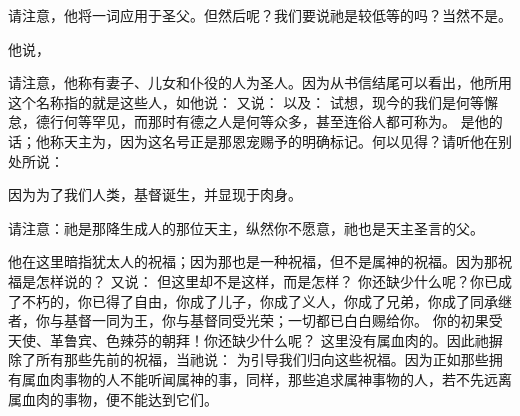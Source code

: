 请注意，他将一词应用于圣父。但然后呢？我们要说祂是较低等的吗？当然不是。\par

他说，\par

请注意，他称有妻子、儿女和仆役的人为圣人。因为从书信结尾可以看出，他所用这个名称指的就是这些人，如他说：  又说：  以及：  试想，现今的我们是何等懈怠，德行何等罕见，而那时有德之人是何等众多，甚至连俗人都可称为。 是他的话；他称天主为，因为这名号正是那恩宠赐予的明确标记。何以见得？请听他在别处所说： \par

\par

因为为了我们人类，基督诞生，并显现于肉身。\par

 \par

请注意：祂是那降生成人的那位天主，纵然你不愿意，祂也是天主圣言的父。\par

 \par

他在这里暗指犹太人的祝福；因为那也是一种祝福，但不是属神的祝福。因为那祝福是怎样说的？  又说：  但这里却不是这样，而是怎样？ 你还缺少什么呢？你已成了不朽的，你已得了自由，你成了儿子，你成了义人，你成了兄弟，你成了同承继者，你与基督一同为王，你与基督同受光荣；一切都已白白赐给你。  你的初果受天使、革鲁宾、色辣芬的朝拜！你还缺少什么呢？ 这里没有属血肉的。因此祂摒除了所有那些先前的祝福，当祂说：  为引导我们归向这些祝福。因为正如那些拥有属血肉事物的人不能听闻属神的事，同样，那些追求属神事物的人，若不先远离属血肉的事物，便不能达到它们。\par

